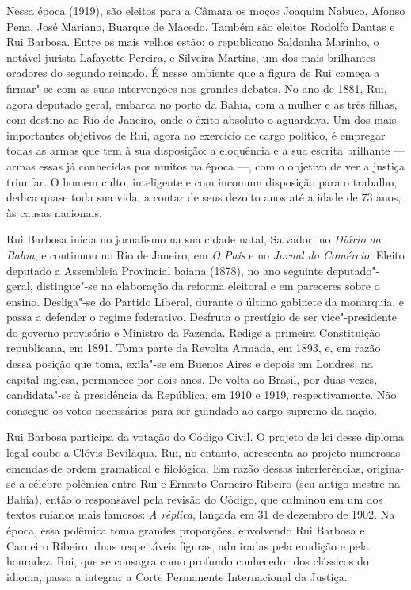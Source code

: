 Nessa época (1919), são eleitos para a Câmara os moços Joaquim Nabuco,
Afonso Pena, José Mariano, Buarque de Macedo. Também são eleitos
Rodolfo Dantas e Rui Barbosa. Entre os mais velhos estão: o republicano
Saldanha Marinho, o notável jurista Lafayette Pereira, e Silveira
Martins, um dos mais brilhantes oradores do segundo reinado. É nesse
ambiente que a figura de Rui começa a firmar"-se com as suas intervenções
nos grandes debates. No ano de 1881, Rui, agora deputado geral, embarca
no porto da Bahia, com a mulher e as três filhas, com destino ao Rio de
Janeiro, onde o êxito absoluto o aguardava. Um dos mais importantes
objetivos de Rui, agora no exercício de cargo político, é empregar
todas as armas que tem à sua disposição: a eloquência e a sua escrita 
brilhante --- armas essas já
conhecidas por muitos na época ---, com o objetivo de ver a justiça
triunfar. O homem culto, inteligente e com incomum disposição para o
trabalho, dedica quase toda sua vida, a contar de seus dezoito anos até
a idade de 73 anos, às causas nacionais.

Rui Barbosa inicia no jornalismo na sua cidade natal, Salvador, no
\textit{Diário da Bahia}, e continuou no Rio de Janeiro, em \textit{O País} e no \textit{Jornal
do Comércio}. Eleito deputado a Assembleia Provincial baiana (1878), no
ano seguinte deputado"-geral, distingue"-se na elaboração da reforma
eleitoral e em pareceres sobre o ensino. Desliga"-se do Partido Liberal,
durante o último gabinete da monarquia, e passa a defender o regime
federativo. Desfruta o prestígio de ser vice"-presidente do governo
provisório e Ministro da Fazenda. Redige a primeira Constituição
republicana, em 1891. Toma parte da Revolta Armada, em 1893, e, em
razão dessa posição que toma, exila"-se em Buenos Aires e depois em
Londres; na capital inglesa, permanece por dois anos. De volta ao
Brasil, por duas vezes, candidata"-se à presidência da República, em
1910 e 1919, respectivamente. Não consegue os votos necessários para
ser guindado ao cargo supremo da nação. 

Rui Barbosa participa da votação do Código Civil. O projeto de lei desse diploma
legal coube a Clóvis Beviláqua. Rui, no entanto, acrescenta ao projeto numerosas
emendas de ordem gramatical e filológica.  Em razão dessas interferências,
origina-se a célebre polêmica entre Rui e Ernesto Carneiro Ribeiro (seu antigo
mestre na Bahia), então o responsável pela revisão do Código, que culminou em um
dos textos ruianos mais famosos: \textit{A réplica}, lançada em 31 de dezembro de 1902.
Na época, essa polêmica toma grandes proporções, envolvendo Rui Barbosa e
Carneiro Ribeiro, duas respeitáveis figuras, admiradas pela erudição e pela
honradez. Rui, que se consagra como profundo conhecedor dos clássicos do idioma,
passa a integrar a Corte Permanente Internacional da Justiça.

